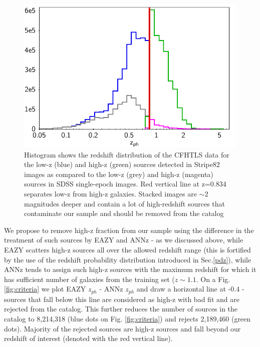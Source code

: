 \documentclass[apj,iop]{emulateapj}
\begin{document}
\begin{figure}
\begin{minipage}{\columnwidth}
\includegraphics[width=\columnwidth,height=0.28\textheight]{figures/hist_lowz_highz_CFHTLS.png}
\caption{Histogram shows the redshift distribution of the CFHTLS data for the low-z (blue) and high-z (green) sources detected in Stripe82 images as compared to the low-z (grey) and high-z (magenta) sources in SDSS single-epoch images. Red vertical line at z=0.834 separates low-z from high-z galaxies. Stacked images are $\sim2$ magnitudes deeper and contain a lot of high-redshift sources that contaminate our sample and should be removed from the catalog}
\label{fig:hist_lowz_highz}
\end{minipage}
\end{figure}

We propose to remove high-z fraction from our sample using the difference in the treatment of such sources by EAZY and ANNz - as we discussed above, while EAZY scatters high-z sources all over the allowed redshift range (this is fortified by the use of the redshift probability distribution introduced in Sec.\ref{pdz}), while ANNz tends to assign such high-z sources with the maximum redshift for which it has sufficient number of galaxies from the training set ($z\sim 1.1$. On a Fig.\ref{fig:criteria} we plot EAZY $z_{ph}$ - ANNz $z_{ph}$ and draw a horizontal line at -0.4 - sources that fall below this line are considered as high-z with bad fit and are rejected from the catalog. This further reduces the number of sources in the catalog to 8,214,318 (blue dots on Fig. \ref{fig:criteria}) and rejects 2,189,460 (green dots). Majority of the rejected sources are high-z sources and fall beyond our redshift of interest (denoted with the red vertical line).
\end{document}
